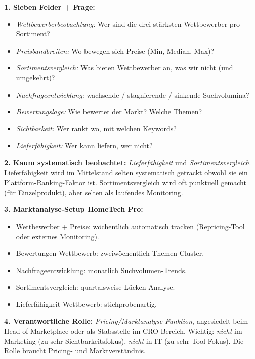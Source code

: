 \documentclass[11pt,a4paper,oneside]{article}
\begin{document}
\begin{loesungbox}
\textbf{1. Sieben Felder + Frage:}
\begin{itemize}
  \item \emph{Wettbewerberbeobachtung:} Wer sind die drei stärksten Wettbewerber pro Sortiment?
  \item \emph{Preisbandbreiten:} Wo bewegen sich Preise (Min, Median, Max)?
  \item \emph{Sortimentsvergleich:} Was bieten Wettbewerber an, was wir nicht (und umgekehrt)?
  \item \emph{Nachfrageentwicklung:} wachsende / stagnierende / sinkende Suchvolumina?
  \item \emph{Bewertungslage:} Wie bewertet der Markt? Welche Themen?
  \item \emph{Sichtbarkeit:} Wer rankt wo, mit welchen Keywords?
  \item \emph{Lieferfähigkeit:} Wer kann liefern, wer nicht?
\end{itemize}

\textbf{2. Kaum systematisch beobachtet:}
\emph{Lieferfähigkeit} und \emph{Sortimentsvergleich}. Lieferfähigkeit wird im Mittelstand selten systematisch getrackt \textendash{} obwohl sie ein Plattform-Ranking-Faktor ist. Sortimentsvergleich wird oft punktuell gemacht (für Einzelprodukt), aber selten als laufendes Monitoring.

\textbf{3. Marktanalyse-Setup HomeTech Pro:}
\begin{itemize}
  \item Wettbewerber + Preise: wöchentlich automatisch tracken (Repricing-Tool oder externes Monitoring).
  \item Bewertungen Wettbewerb: zweiwöchentlich Themen-Cluster.
  \item Nachfrageentwicklung: monatlich Suchvolumen-Trends.
  \item Sortimentsvergleich: quartalsweise Lücken-Analyse.
  \item Lieferfähigkeit Wettbewerb: stichprobenartig.
\end{itemize}

\textbf{4. Verantwortliche Rolle:}
\emph{Pricing/Marktanalyse-Funktion}, angesiedelt beim Head of Marketplace oder als Stabsstelle im CRO-Bereich. Wichtig: \emph{nicht} im Marketing (zu sehr Sichtbarkeitsfokus), \emph{nicht} in IT (zu sehr Tool-Fokus). Die Rolle braucht Pricing- und Marktverständnis.
\end{loesungbox}

\clearpage
\end{document}

